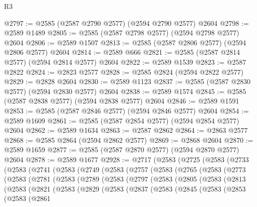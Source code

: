\begin{lexlean}{R3}
\begin{coremodule}
@2797 := @2585 (@2587 @2790 @2577) (@2594 @2790 @2577) @2604
@2798 := @2589 @1489
@2805 := @2585 (@2587 @2798 @2577) (@2594 @2798 @2577) @2604
@2806 := @2589 @1507
@2813 := @2585 (@2587 @2806 @2577) (@2594 @2806 @2577) @2604
@2814 := @2589 @666
@2821 := @2585 (@2587 @2814 @2577) (@2594 @2814 @2577) @2604
@2822 := @2589 @1539
@2823 := @2587 @2822
@2824 := @2823 @2577
@2828 := @2585 @2824 (@2594 @2822 @2577)
@2829 := @2828 @2604
@2830 := @2589 @1123
@2837 := @2585 (@2587 @2830 @2577) (@2594 @2830 @2577) @2604
@2838 := @2589 @1574
@2845 := @2585 (@2587 @2838 @2577) (@2594 @2838 @2577) @2604
@2846 := @2589 @1591
@2853 := @2585 (@2587 @2846 @2577) (@2594 @2846 @2577) @2604
@2854 := @2589 @1609
@2861 := @2585 (@2587 @2854 @2577) (@2594 @2854 @2577) @2604
@2862 := @2589 @1634
@2863 := @2587 @2862
@2864 := @2863 @2577
@2868 := @2585 @2864 (@2594 @2862 @2577)
@2869 := @2868 @2604
@2870 := @2589 @1659
@2877 := @2585 (@2587 @2870 @2577) (@2594 @2870 @2577) @2604
@2878 := @2589 @1677
@2928 := @2717
    (@2583
      (@2725
        (@2583
          (@2733
            (@2583
              (@2741
                (@2583
                  (@2749
                    (@2583
                      (@2757
                        (@2583
                          (@2765
                            (@2583
                              (@2773
                                (@2583
                                  (@2781
                                    (@2583
                                      (@2789
                                        (@2583
                                          (@2797
                                            (@2583
                                              (@2805
                                                (@2583
                                                  (@2813
                                                    (@2583
                                                      (@2821
                                                        (@2583
                                                          (@2829
                                                            (@2583
                                                              (@2837
                                                                (@2583
                                                                  (@2845
                                                                    (@2583
                                                                      (@2853
                                                                        (@2583
                                                                          (@2861

\end{coremodule}
\end{lexlean}
